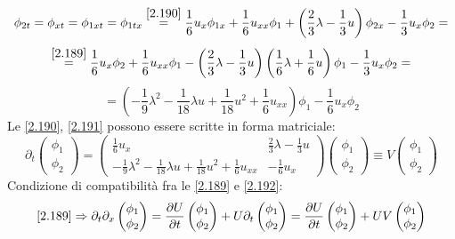 \documentclass[a4paper,11pt]{report}
\begin{document}
\[
\phi_{2t}=\phi_{xt}=\phi_{1xt}=\phi_{1tx} \overset{\eqref{2.190}}{=} \frac{1}{6}u_x\phi_{1x} + \frac{1}{6}u_{xx}\phi_1 + \left(\frac{2}{3}\lambda - \frac{1}{3}u\right)\phi_{2x} - \frac{1}{3}u_x\phi_2=
\]
\[
\overset{\eqref{2.189}}{=}\frac{1}{6}u_x\phi_2 + \frac{1}{6}u_{xx}\phi_1 - \left(\frac{2}{3}\lambda - \frac{1}{3}u\right)\left(\frac{1}{6}\lambda + \frac{1}{6}u \right)\phi_1-\frac{1}{3}u_x\phi_2=
\]
\begin{equation}
=\left(-\frac{1}{9}\lambda^2 - \frac{1}{18} \lambda u + \frac{1}{18}u^2 + \frac{1}{6}u_{xx}\right)\phi_1 - \frac{1}{6}u_x\phi_2 
\label{2.191}
\end{equation}
Le \eqref{2.190}, \eqref{2.191} possono essere scritte in forma matriciale:
\begin{equation}
\partial_t\left(\begin{matrix}
\phi_1 \\
\phi_2
\end{matrix} \right) = \left( \begin{matrix}
\frac{1}{6}u_x & \frac{2}{3}\lambda - \frac{1}{3}u \\
-\frac{1}{9}\lambda^2 - \frac{1}{18} \lambda u + \frac{1}{18}u^2 + \frac{1}{6}u_{xx} & - \frac{1}{6}u_x
\end{matrix}\right)\left(\begin{matrix}
\phi_1 \\
\phi_2
\end{matrix} \right) \equiv V \left(\begin{matrix}
\phi_1 \\
\phi_2
\end{matrix} \right)
\label{2.192}
\end{equation}
Condizione di compatibilit\`a fra le \eqref{2.189} e \eqref{2.192}:
\[
\eqref{2.189}\Rightarrow \partial_t \partial_x \left(\begin{matrix}
\phi_1 \\
\phi_2
\end{matrix} \right) = \frac{\partial U}{\partial t}\left(\begin{matrix}
\phi_1 \\
\phi_2
\end{matrix} \right) + U\partial_t \left(\begin{matrix}
\phi_1 \\
\phi_2
\end{matrix} \right) = \frac{\partial U}{\partial t}\left(\begin{matrix}
\phi_1 \\
\phi_2
\end{matrix} \right) + UV \left(\begin{matrix}
\phi_1 \\
\phi_2
\end{matrix} \right)
\]
\end{document}
